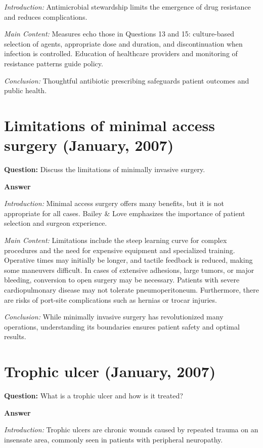 \documentclass{article}
\begin{document}
\emph{Introduction:} Antimicrobial stewardship limits the emergence of drug resistance and reduces complications.

\emph{Main Content:} Measures echo those in Questions 13 and 15: culture-based selection of agents, appropriate dose and duration, and discontinuation when infection is controlled. Education of healthcare providers and monitoring of resistance patterns guide policy.

\emph{Conclusion:} Thoughtful antibiotic prescribing safeguards patient outcomes and public health.


\section{Limitations of minimal access surgery (January, 2007)}


\textbf{Question:} Discuss the limitations of minimally invasive surgery.

\textbf{Answer}

\emph{Introduction:} Minimal access surgery offers many benefits, but it is not appropriate for all cases. Bailey \& Love emphasizes the importance of patient selection and surgeon experience.

\emph{Main Content:} Limitations include the steep learning curve for complex procedures and the need for expensive equipment and specialized training. Operative times may initially be longer, and tactile feedback is reduced, making some maneuvers difficult. In cases of extensive adhesions, large tumors, or major bleeding, conversion to open surgery may be necessary. Patients with severe cardiopulmonary disease may not tolerate pneumoperitoneum. Furthermore, there are risks of port-site complications such as hernias or trocar injuries.

\emph{Conclusion:} While minimally invasive surgery has revolutionized many operations, understanding its boundaries ensures patient safety and optimal results.


\section{Trophic ulcer (January, 2007)}


\textbf{Question:} What is a trophic ulcer and how is it treated?

\textbf{Answer}

\emph{Introduction:} Trophic ulcers are chronic wounds caused by repeated trauma on an insensate area, commonly seen in patients with peripheral neuropathy.
\end{document}
